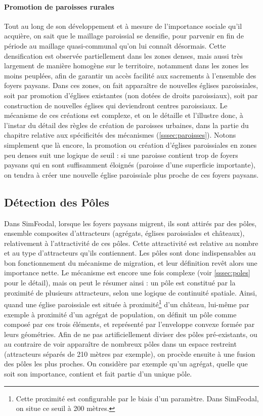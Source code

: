 \paragraph{Promotion de paroisses \og rurales\fg{}} Tout au long de son développement et à mesure de l'importance sociale qu'il acquière, on sait que le maillage paroissial se densifie, pour parvenir en fin de période au maillage quasi-communal qu'on lui connaît désormais.
Cette densification est observée partiellement dans les zones denses, mais aussi très largement de manière homogène sur le territoire, notamment dans les zones les moins peuplées, afin de garantir un accès facilité aux sacrements à l'ensemble des foyers paysans.
Dans ces zones, on fait apparaître de nouvelles églises paroissiales, soit par promotion d'églises existantes (non dotées de droits paroissiaux), soit par construction de nouvelles églises qui deviendront centres paroissiaux.
Le mécanisme de ces créations est complexe, et on le détaille et l'illustre donc, à l'instar du détail des règles de création de paroisses \og urbaines\fg{}, dans la partie du chapitre relative aux spécificités des mécanismes (\cref{sssec:paroisses}).
Notons simplement que là encore, la promotion ou création d'églises paroissiales en zones peu denses suit une logique de seuil : si une paroisse contient trop de foyers paysans qui en sont suffisamment éloignés (paroisse d'une superficie importante), on tendra à créer une nouvelle église paroissiale plus proche de ces foyers paysans.

\subsection{Détection des Pôles}

Dans SimFeodal, lorsque les foyers paysans migrent, ils sont attirés par des pôles, ensemble composites d'attracteurs (agrégats, églises paroissiales et châteaux), relativement à l'attractivité de ces pôles.
Cette attractivité est relative au nombre et au type d'attracteurs qu'ils contiennent.
Les pôles sont donc indispensables au bon fonctionnement du mécanisme de migration, et leur définition revêt alors une importance nette.
Le mécanisme est encore une fois complexe (voir \cref{sssec:poles} pour le détail), mais on peut le résumer ainsi : un pôle est constitué par la proximité de plusieurs attracteurs, selon une logique de continuité spatiale.
Ainsi, quand une église paroissiale est située à proximité\footnote{
Cette proximité est configurable par le biais d'un paramètre.
Dans SimFeodal, on situe ce seuil à 200 mètres.
} d'un château, lui-même par exemple à proximité d'un agrégat de population, on définit un pôle comme composé par ces trois éléments, et représenté par l'enveloppe convexe formée par leurs géométries.
Afin de ne pas artificiellement diviser des pôles pré-existants, ou au contraire de voir apparaître de nombreux pôles dans un espace restreint (attracteurs séparés de 210 mètres par exemple), on procède ensuite à une fusion des pôles les plus proches.
On considère par exemple qu'un agrégat, quelle que soit son importance, contient et fait partie d'un unique pôle.


